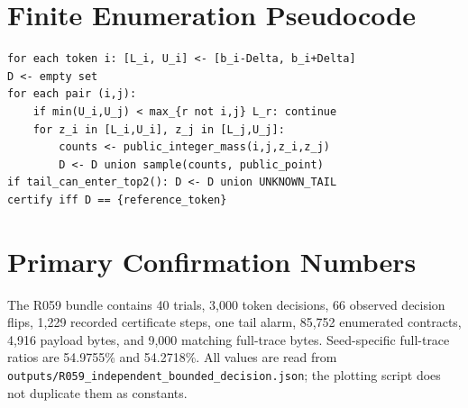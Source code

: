 \documentclass[sigconf,review,nonacm]{acmart}
\begin{document}
\balance



\appendix
\section{Finite Enumeration Pseudocode}
\begin{lstlisting}[basicstyle=\ttfamily\scriptsize,frame=single,breaklines=true]
for each token i: [L_i, U_i] <- [b_i-Delta, b_i+Delta]
D <- empty set
for each pair (i,j):
    if min(U_i,U_j) < max_{r not i,j} L_r: continue
    for z_i in [L_i,U_i], z_j in [L_j,U_j]:
        counts <- public_integer_mass(i,j,z_i,z_j)
        D <- D union sample(counts, public_point)
if tail_can_enter_top2(): D <- D union UNKNOWN_TAIL
certify iff D == {reference_token}
\end{lstlisting}

\section{Primary Confirmation Numbers}
The R059 bundle contains 40 trials, 3,000 token decisions, 66 observed decision flips, 1,229 recorded certificate steps, one tail alarm, 85,752 enumerated contracts, 4,916 payload bytes, and 9,000 matching full-trace bytes. Seed-specific full-trace ratios are 54.9755\% and 54.2718\%. All values are read from \nolinkurl{outputs/R059_independent_bounded_decision.json}; the plotting script does not duplicate them as constants.
\end{document}
